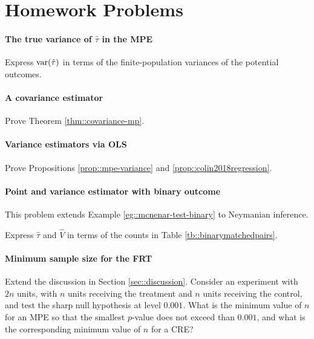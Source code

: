 \section{Homework Problems}

\paragraph{The true variance of $\hat{\tau}$ in the MPE}
\label{para::variance-mp-design}

Express $\textup{var}(\hat{\tau})$ in terms of the finite-population variances of the potential outcomes. 

\paragraph{A covariance estimator}\label{para::covariance-est-proof}
Prove Theorem \ref{thm::covariance-mp}.

\paragraph{Variance estimators via OLS}\label{para::seols-matchedpairs}
Prove Propositions \ref{prop::mpe-variance} and \ref{prop::colin2018regression}. 


\paragraph{Point and variance estimator with binary outcome}\label{para::binary-matchedpairs-neyman}


This problem extends Example \ref{eg::mcnenar-test-binary} to Neymanian inference. 

Express $\hat\tau$ and $\hat V$ in terms of the counts in Table \ref{tb::binarymatchedpairs}. 




\paragraph{Minimum sample size for the FRT}
\label{prob::minimum-n-0.001}

Extend the discussion in Section \ref{sec::discussion}.  Consider an experiment with $2n$ units, with $n$ units receiving the treatment and $n$ units receiving the control, and test the sharp null hypothesis at level $0.001$. What is the minimum value of $n$ for an MPE so that the smallest $p$-value does not exceed than $0.001$, and what is the corresponding minimum value of $n$ for a CRE?
 

